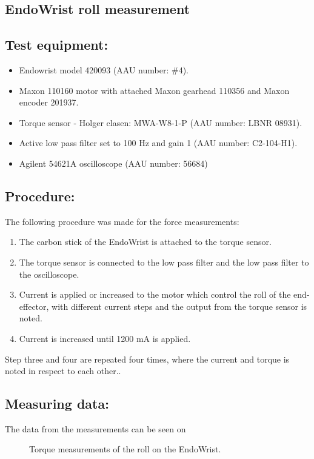 \subsection{EndoWrist roll measurement}%


\subsection*{Test equipment:}
\begin{itemize}
\item Endowrist model 420093 (AAU number: \#4).
\item Maxon 110160 motor with attached Maxon gearhead 110356 and Maxon encoder 201937.
\item Torque sensor - Holger clasen: MWA-W8-1-P (AAU number: LBNR 08931).
\item Active low pass filter set to 100 Hz and gain 1 (AAU number: C2-104-H1).
\item Agilent 54621A oscilloscope (AAU number: 56684)
\end{itemize}

\subsection*{Procedure:}
The following procedure was made for the force measurements:
\begin{enumerate}
\item The carbon stick of the EndoWrist is attached to the torque sensor. 
\item The torque sensor is connected to the low pass filter and the low pass filter to the oscilloscope.
\item Current is applied or increased to the motor which control the roll of the end-effector, with different current steps and the output from the torque sensor is noted.
\item Current is increased until 1200 mA is applied.
\end{enumerate}
Step three and four are repeated four times, where the current and torque is noted in respect to each other.. 

\subsection*{Measuring data:}
The data from the measurements can be seen on 

\begin{figure}

\caption{Torque measurements of the roll on the EndoWrist.}
\label{fig_roll_mes}
\end{figure}

